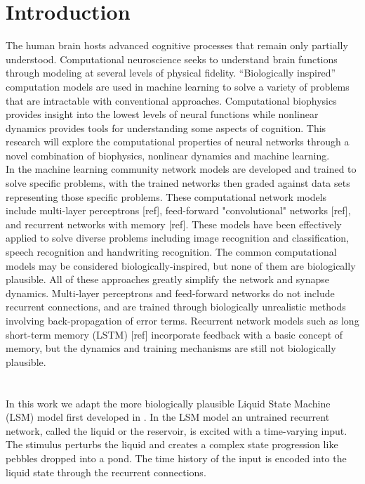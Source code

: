 \documentclass[a4paper,11pt]{article}
\begin{document}
\section{Introduction} 
 The human brain hosts advanced cognitive processes that remain only partially understood.
Computational neuroscience seeks to understand brain functions through modeling at several levels of physical fidelity.
``Biologically inspired'' computation models are used in machine learning to solve a variety of problems that are intractable with conventional approaches.
Computational biophysics provides insight into the lowest levels of neural functions while nonlinear dynamics provides tools for understanding some aspects of cognition.
This research will explore the computational properties of neural networks through a novel combination of biophysics, nonlinear dynamics and machine learning.
\\
In the machine learning community network models are developed and trained to solve specific problems, with the trained networks then graded against data sets representing those specific problems.
These computational network models include multi-layer perceptrons [ref], feed-forward "convolutional" networks [ref], and recurrent networks with memory [ref].
These models have been effectively applied to solve diverse problems including image recognition and classification, speech recognition and handwriting recognition.
The common computational models may be considered biologically-inspired, but none of them are biologically plausible.
All of these approaches greatly simplify the network and synapse dynamics.
Multi-layer perceptrons and feed-forward networks do not include recurrent connections, and are trained through biologically unrealistic methods involving back-propagation of error terms.
Recurrent network models such as long short-term memory (LSTM) [ref] incorporate feedback with a basic concept of memory, but the dynamics and training mechanisms are still not biologically plausible. \\
\\ \\
In this work we adapt the more biologically plausible Liquid State Machine (LSM) model first developed in \cite{maas2002}.
In the LSM model an untrained recurrent network, called the liquid or the reservoir, is excited with a time-varying input.
The stimulus perturbs the liquid and creates a complex state progression like pebbles dropped into a pond.
The time history of the input is encoded into the liquid state through the recurrent connections.
\end{document}

